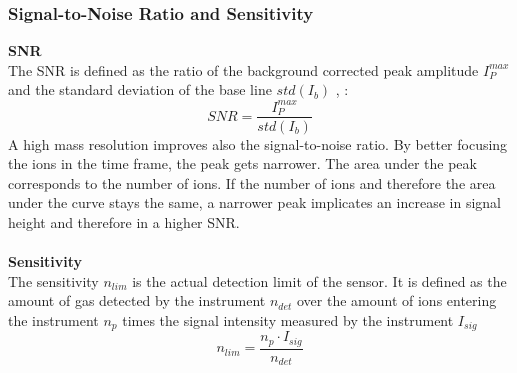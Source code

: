 	\subsubsection{Signal-to-Noise Ratio and Sensitivity}
	
	\textbf{SNR}\\ %
	The SNR is defined as the ratio of the background corrected peak amplitude $I^{max}_P$ and the standard deviation of the base line $std(I_b)$ \cite{Agilent_TechNote_SNR}, \cite{Master_Meyer}: %
	\begin{equation}
		SNR = \frac{I^{max}_P}{std(I_b)}
		\label{eq:SNR}
	\end{equation}
	A high mass resolution improves also the signal-to-noise ratio. By better focusing the ions in the time frame, the peak gets narrower. The area under the peak corresponds to the number of ions. If the number of ions and therefore the area under the curve stays the same, a narrower peak implicates an increase in signal height and therefore in a higher SNR.\\ %
	\\
	\textbf{Sensitivity} \\ %
	The sensitivity $n_{lim}$ is the actual detection limit of the sensor. It is defined as the amount of gas detected by the instrument $n_{det}$ over the amount of ions entering the instrument $n_{p}$ times the signal intensity measured by the instrument $I_{sig}$
	\begin{equation}
		n_{lim} = \frac{n_p \cdot I_{sig}}{n_{det}}
	\end{equation}
	
	

	

	
	
